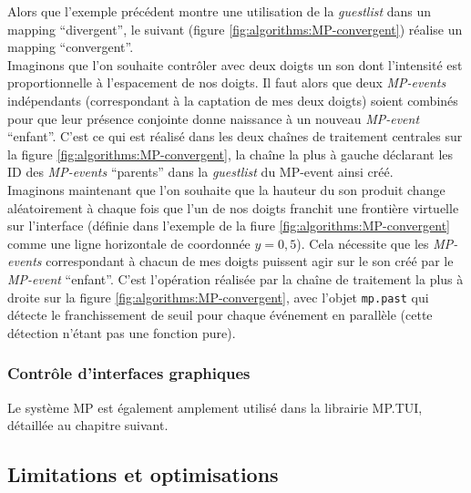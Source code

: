 \noindent Alors que l'exemple précédent montre une utilisation de la \textit{guestlist} dans un mapping ``divergent'', le suivant (figure \ref{fig:algorithms:MP-convergent}) réalise un mapping ``convergent''.\\
\indent Imaginons que l'on souhaite contrôler avec deux doigts un son dont l'intensité est proportionnelle à l'espacement de nos doigts. Il faut alors que deux \textit{MP-events} indépendants (correspondant à la captation de mes deux doigts) soient combinés pour que leur présence conjointe donne naissance à un nouveau \textit{MP-event} ``enfant''. C'est ce qui est réalisé dans les deux chaînes de traitement centrales sur la figure \ref{fig:algorithms:MP-convergent}, la chaîne la plus à gauche déclarant les ID des \textit{MP-events} ``parents'' dans la \textit{guestlist} du MP-event ainsi créé.\\
\indent Imaginons maintenant que l'on souhaite que la hauteur du son produit change aléatoirement à chaque fois que l'un de nos doigts franchit une frontière virtuelle sur l'interface (définie dans l'exemple de la fiure \ref{fig:algorithms:MP-convergent} comme une ligne horizontale de coordonnée $y=0,5$). Cela nécessite que les \textit{MP-events} correspondant à chacun de mes doigts puissent agir sur le son créé par le \textit{MP-event} ``enfant''. C'est l'opération réalisée par la chaîne de traitement la plus à droite sur la figure \ref{fig:algorithms:MP-convergent}, avec l'objet \verb|mp.past| qui détecte le franchissement de seuil pour chaque événement en parallèle (cette détection n'étant pas une fonction pure).


\subsubsection*{Contrôle d'interfaces graphiques}
\label{sec:algorithms:example-mpTUI}
\noindent Le système MP est également amplement utilisé dans la librairie MP.TUI, détaillée au chapitre suivant.

\subsection{Limitations et optimisations}

